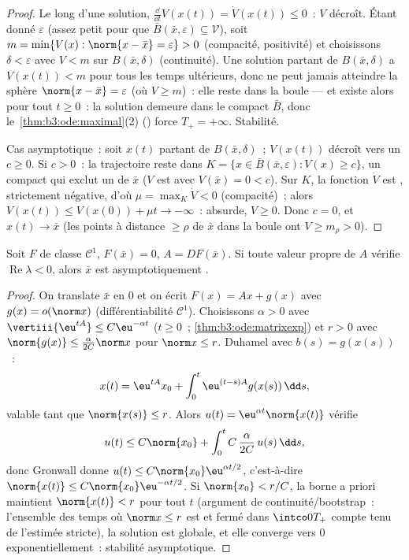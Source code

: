 \begin{proof}
Le long d'une solution, $\frac{\dd}{\dd t}V(x(t)) =
\dot V(x(t)) \leq 0$~: $V$ décroît. Étant donné $\varepsilon$
(assez petit pour que $\bar B(\bar x, \varepsilon) \subseteq
\mathcal V$), soit $m = \min\{V(x) : \norm{x - \bar x} =
\varepsilon\} > 0$ (compacité, positivité) et choisissons
$\delta < \varepsilon$ avec $V < m$ sur $B(\bar x, \delta)$
(continuité). Une solution partant de $B(\bar x, \delta)$ a
$V(x(t)) < m$ pour tous les temps ultérieurs, donc ne peut
jamais atteindre la sphère $\norm{x - \bar x} = \varepsilon$
(où $V \geq m$)~: elle reste dans la boule --- et existe alors
pour tout $t \geq 0$~: la solution demeure dans le compact
$\bar B$, donc le~\cref{thm:b3:ode:maximal}(2)
() force $T_+ = +\infty$. Stabilité.

Cas asymptotique~: soit $x(t)$ partant de $B(\bar x,
\delta)$~; $V(x(t))$ décroît vers un $c \geq 0$. Si $c > 0$~:
la trajectoire reste dans $K = \{x \in \bar B(\bar x,
\varepsilon): V(x) \geq c\}$, un compact qui exclut un
 de $\bar x$ ($V$ est  avec $V(\bar x) = 0 <
c$). Sur $K$, la fonction $\dot V$ est , strictement
négative, d'où $\mu = \max_K\dot V < 0$ (compacité)~; alors
$V(x(t)) \leq V(x(0)) + \mu t \to -\infty$~: absurde, $V \geq
0$. Donc $c = 0$, et $x(t) \to \bar x$ (les points à distance
$\geq \rho$ de $\bar x$ dans la boule ont $V \geq m_\rho >
0$).
\end{proof}

\begin{theorem}
\label{thm:b3:ode:linearization}
Soit $F$ de classe $\mathcal C^1$, $F(\bar x) = 0$, $A =
DF(\bar x)$. Si toute valeur propre de $A$ vérifie
$\operatorname{Re}\lambda < 0$, alors $\bar x$ est
asymptotiquement .
\end{theorem}

\begin{proof}
On translate $\bar x$ en $0$ et on écrit $F(x) = Ax + g(x)$
avec $g(x) = o(\norm x)$ (différentiabilité $\mathcal C^1$).
Choisissons $\alpha > 0$ avec $\vertiii{\eu^{tA}} \leq
C\eu^{-\alpha t}$ ($t \geq 0$~;
\cref{thm:b3:ode:matrixexp}) et $r > 0$ avec $\norm{g(x)}
\leq \frac{\alpha}{2C}\norm x$ pour $\norm x \leq r$. Duhamel
avec $b(s) = g(x(s))$~:
\[
x(t) = \eu^{tA}x_0 + \int_0^t\eu^{(t-s)A}g(x(s))\,\dd s,
\]
valable tant que $\norm{x(s)} \leq r$. Alors $u(t) =
\eu^{\alpha t}\norm{x(t)}$ vérifie
\[
u(t) \leq C\norm{x_0} +
\int_0^{t}C\,\frac{\alpha}{2C}\,u(s)\,\dd s ,
\]
donc Gronwall donne $u(t) \leq C\norm{x_0}\eu^{\alpha t/2}$,
c'est-à-dire $\norm{x(t)} \leq C\norm{x_0}\eu^{-\alpha t/2}$.
Si $\norm{x_0} < r/C$, la borne a priori maintient
$\norm{x(t)} < r$ pour tout $t$ (argument de
continuité/bootstrap~: l'ensemble des temps où $\norm x \leq
r$ est  et fermé dans $\intco0{T_+}$ compte tenu de
l'estimée stricte), la solution est globale, et elle converge
vers $0$ exponentiellement~: stabilité asymptotique.
\end{proof}


